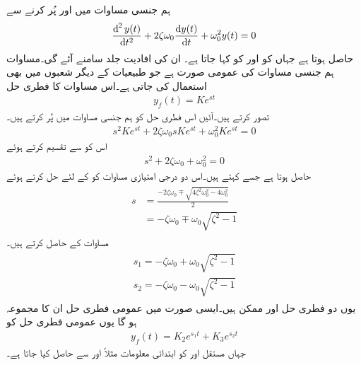 ہم جنسی مساوات میں  اور  پُر کرنے سے
\begin{align}\label{مساوات_عارضی_دو_درجی_عمومی_ہم_جنسی_ب}
\frac{\dif^{\,2} y(t)}{\dif t^2}+2\zeta \omega_0\frac{\dif y(t)}{\dif t}+\omega_0^2 y(t)=0
\end{align}
حاصل ہوتا ہے جہاں  کو 
 اور  کو  کہا جاتا ہے۔ ان کی افادیت جلد سامنے آئے گی۔مساوات   ہم جنسی مساوات کی عمومی صورت ہے جو طبیعیات کے دیگر شعبوں میں بھی استعمال کی جاتی ہے۔اس مساوات کا فطری حل
\begin{align*}
y_f(t)=Ke^{st}
\end{align*}
تصور کرتے ہیں۔آئیں اس فطری حل کو ہم جنسی مساوات میں پُر کرتے ہیں۔
\begin{align*}
s^2 K e^{st}+2\zeta\omega_0 s K e^{st}+\omega_0^2 K e^{st}=0
\end{align*}
اس کو  سے تقسیم کرتے ہوئے
\begin{align}
s^2+2\zeta\omega_0+\omega_0^2=0
\end{align}
حاصل ہوتا ہے جسے  کہتے ہیں۔اس دو درجی امتیازی مساوات کو  کے لئے حل کرتے ہوئے
\begin{gather}
\begin{aligned}
s&=\frac{-2\zeta\omega_0\mp\sqrt{4\zeta^2\omega_0^2-4\omega_0^2}}{2}\\
&=-\zeta\omega_0\mp \omega_0\sqrt{\zeta^2-1}
\end{aligned}
\end{gather}
مساوات کے  حاصل کرتے ہیں۔
\begin{gather}
\begin{aligned}\label{مساوات_عارضی_دو_درجی_ہم_سمتی_عمومی_حل_الف}
s_1=-\zeta\omega_0+ \omega_0\sqrt{\zeta^2-1}\\
s_2=-\zeta\omega_0- \omega_0\sqrt{\zeta^2-1}
\end{aligned}
\end{gather}
یوں دو فطری حل  اور  ممکن ہیں۔ایسی صورت میں عمومی فطری حل ان کا مجموعہ ہو گا
یوں عمومی فطری حل کو 
\begin{align}
y_f(t)=K_2 e^{s_1 t}+K_3 e^{s_2 t}
\end{align}
جہاں مستقل  اور  کو ابتدائی معلومات مثلاً  اور  سے حاصل کیا جاتا ہے۔

